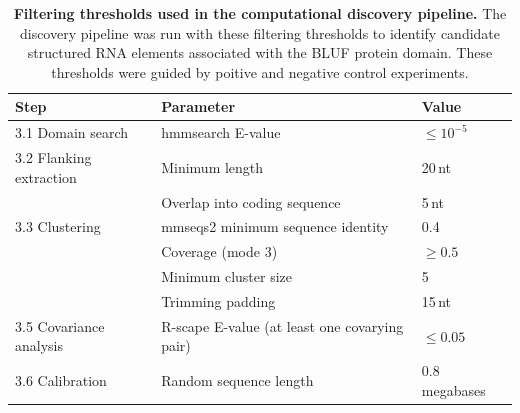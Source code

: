\begin{table}[H]
\centering
\caption[Filtering thresholds used in the computational discovery pipeline]{\textbf{Filtering thresholds used in the computational discovery pipeline.}
    The discovery pipeline was run with these filtering thresholds to identify candidate structured RNA elements associated with the \ac{BLUF} protein domain.
    These thresholds were guided by poitive and negative control experiments.}
\label{tab:thresholds}
\begin{tabular}{@{}lll@{}}
\toprule
Step & Parameter & Value \\
\midrule
3.1 Domain search & hmmsearch E-value & $\leq 10^{-5}$ \\
3.2 Flanking extraction & Minimum length & 20\,nt \\
 & Overlap into coding sequence & 5\,nt \\
3.3 Clustering & mmseqs2 minimum sequence identity & 0.4 \\
 & Coverage (mode 3) & $\geq 0.5$ \\
 & Minimum cluster size & 5 \\
 & Trimming padding & 15\,nt \\
3.5 Covariance analysis & R-scape E-value (at least one covarying pair) & $\leq 0.05$ \\
3.6 Calibration & Random sequence length & $0.8$ megabases \\
\bottomrule
\end{tabular}
\end{table}
